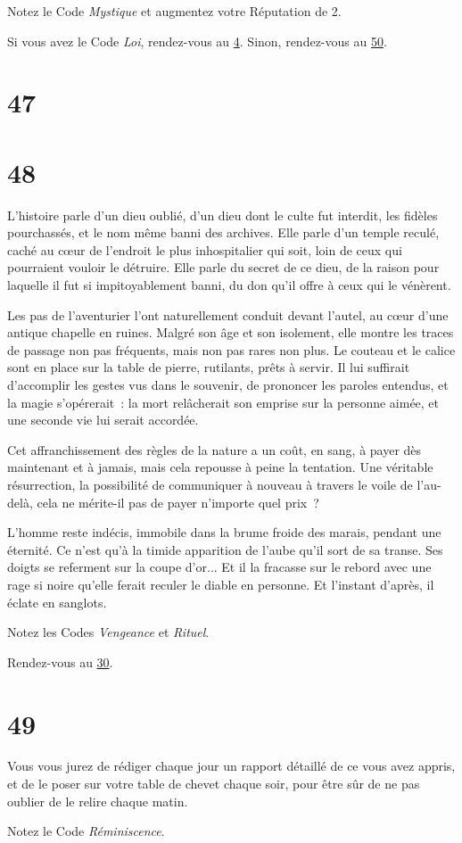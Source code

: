 \documentclass{report}
\newcommand{\gsection}[1]{
    \section{#1}
    \label{section-#1}
}
\newcommand{\glink}[1]{\hyperref[section-#1]{#1}}
\begin{document}
Notez le Code \emph{Mystique} et augmentez votre Réputation de 2.

Si vous avez le Code \emph{Loi}, rendez-vous au \glink{4}. Sinon, rendez-vous au \glink{50}.

\gsection{47}

\gsection{48}

L'histoire parle d'un dieu oublié, d'un dieu dont le culte fut interdit, les fidèles pourchassés, et le nom même banni des archives. Elle parle d'un temple reculé, caché au cœur de l'endroit le plus inhospitalier qui soit, loin de ceux qui pourraient vouloir le détruire. Elle parle du secret de ce dieu, de la raison pour laquelle il fut si impitoyablement banni, du don qu'il offre à ceux qui le vénèrent.

Les pas de l'aventurier l'ont naturellement conduit devant l'autel, au cœur d'une antique chapelle en ruines. Malgré son âge et son isolement, elle montre les traces de passage non pas fréquents, mais non pas rares non plus. Le couteau et le calice sont en place sur la table de pierre, rutilants, prêts à servir. Il lui suffirait d'accomplir les gestes vus dans le souvenir, de prononcer les paroles entendus, et la magie s'opérerait : la mort relâcherait son emprise sur la personne aimée, et une seconde vie lui serait accordée.

Cet affranchissement des règles de la nature a un coût, en sang, à payer dès maintenant et à jamais, mais cela repousse à peine la tentation. Une véritable résurrection, la possibilité de communiquer à nouveau à travers le voile de l'au-delà, cela ne mérite-il pas de payer n'importe quel prix ?

L'homme reste indécis, immobile dans la brume froide des marais, pendant une éternité. Ce n'est qu'à la timide apparition de l'aube qu'il sort de sa transe. Ses doigts se referment sur la coupe d'or... Et il la fracasse sur le rebord avec une rage si noire qu'elle ferait reculer le diable en personne. Et l'instant d'après, il éclate en sanglots.

Notez les Codes \emph{Vengeance} et \emph{Rituel}.

Rendez-vous au \glink{30}.

\gsection{49}

Vous vous jurez de rédiger chaque jour un rapport détaillé de ce vous avez appris, et de le poser sur votre table de chevet chaque soir, pour être sûr de ne pas oublier de le relire chaque matin.

Notez le Code \emph{Réminiscence}.
\end{document}
